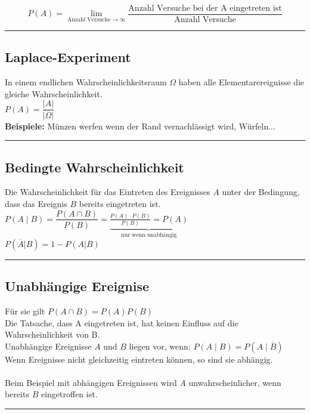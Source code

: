 	\[P(A)=\lim\limits_{\text{Anzahl Versuche} \to \infty} \dfrac{\text{Anzahl Versuche bei der A eingetreten ist}}{\text{Anzahl Versuche}}
	\]
\vspace{.2cm}
\hrule

\subsection{Laplace-Experiment}
	In einem endlichen Wahrscheinlichkeitsraum $\Omega$ haben alle
	Elementarereignisse die gleiche Wahrscheinlichkeit.\\[2pt]
	$\boxed{P(A)=\dfrac{\left| A\right|}{\left|\Omega\right|}}$\\[2pt]
	\textbf{Beispiele:} Münzen werfen wenn der Rand vernachlässigt wird, Würfeln... 
\vspace{.2cm}
\hrule


\subsection{Bedingte Wahrscheinlichkeit}
	Die Wahrscheinlichkeit für das Eintreten des Ereignisses $A$ unter der
	Bedingung, dass das Ereignis $B$ bereits eingetreten ist.\\[.2cm]
	$\boxed{P(A\mid B)= \dfrac{P(A\cap B)}{P(B)}}=\underbrace{\frac{P(A)\cdot
	  P(B)}{P(B)}=P(A)}_{\text{nur wenn unabhängig}}$ \\
		$P(\overline{A}|B) = 1 -
	  P(A|B)$
\vspace{.2cm}
\hrule

\subsection{Unabhängige Ereignise}
	Für sie gilt \hspace*{5mm} $\boxed{P(A\cap B)=P(A)P(B)}$\\[2pt]
   	Die Tatsache, dass A eingetreten ist, hat keinen Einfluss auf die 
	Wahrscheinlichkeit von B.\\
	Unabhängige Ereignisse $A$ und $B$ liegen vor, wenn: 
	\hspace*{5mm} $P(A\mid B)=P(A\mid \overline{B})$ \\	
	Wenn Ereignisse nicht gleichzeitig eintreten können, so sind sie abhängig.\\
	\\
	Beim Beispiel mit abhängigen Ereignissen wird $A$ unwahrscheinlicher, wenn bereits $B$ eingetroffen ist.  
\vspace{.2cm}
\hrule

